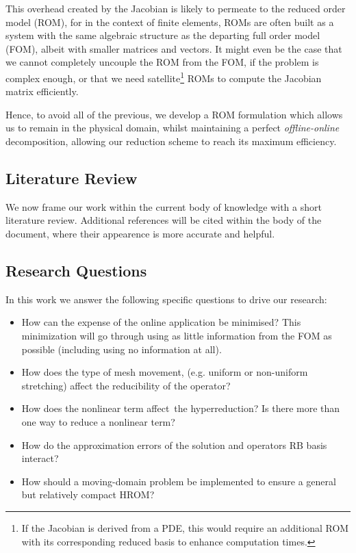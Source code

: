 \documentclass[thesis.tex]{subfiles}
\begin{document}
This overhead created by the Jacobian is likely to permeate to the reduced order model (ROM),
for in the context of finite elements, ROMs are often built as a system with the same algebraic structure
as the departing full order model (FOM),
albeit with smaller matrices and vectors. 
It might even be the case that we cannot completely uncouple the ROM from the FOM, 
if the problem is complex enough, or that we need satellite\footnote
{
    If the Jacobian is derived from a PDE, 
    this would require an additional ROM with its corresponding reduced basis to 
    enhance computation times.
} ROMs to compute the Jacobian matrix efficiently.

Hence, to avoid all of the previous, 
we develop a ROM formulation which allows us to remain in the physical domain, 
whilst maintaining a perfect \textit{offline-online} decomposition,
allowing our reduction scheme to reach its maximum efficiency.

\subsection{Literature Review}
We now frame our work within the current body of knowledge 
with a short literature review.
Additional references will be cited within the body of the document, 
where their appearence is more accurate and helpful.  


\clearpage
\subsection{Research Questions}
In this work we answer the following specific questions to drive our research:
\begin{itemize}
    \item How can the expense of the online application be minimised? 
    This minimization will go through using 
    as little information from the FOM as possible 
    (including using no information at all).
    \item How does the type of mesh movement, 
    (e.g. uniform or non-uniform stretching) 
    affect the reducibility of the operator?
    \item How does the nonlinear term affect the hyperreduction?
    Is there more than one way to reduce a nonlinear term?
    \item How do the approximation errors of
    the solution and operators RB basis interact?
    \item How should a moving-domain problem be implemented to 
    ensure a general but relatively compact HROM? 
\end{itemize}
\end{document}
